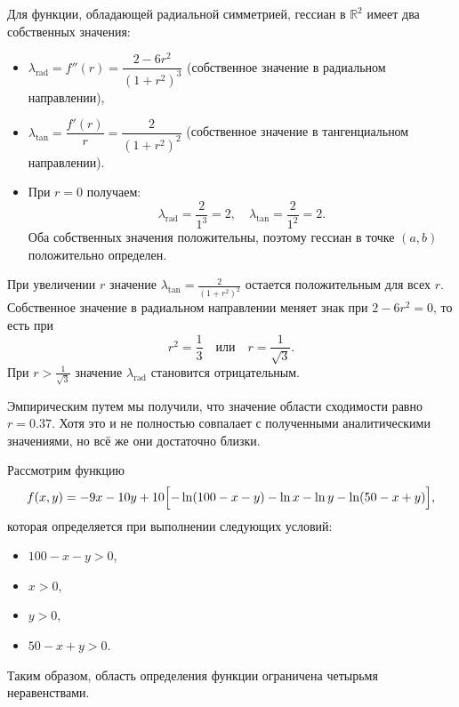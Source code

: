 \documentclass[a4paper,12pt]{article}
\begin{document}
Для функции, обладающей радиальной симметрией, гессиан в \(\mathbb{R}^2\) имеет два собственных значения:
\begin{itemize}
    \item \(\lambda_{\text{rad}} = f''(r) = \dfrac{2-6r^2}{(1+r^2)^3}\) \quad (собственное значение в радиальном направлении),
    \item \(\lambda_{\text{tan}} = \dfrac{f'(r)}{r} = \dfrac{2}{(1+r^2)^2}\) \quad (собственное значение в тангенциальном направлении).
\end{itemize}

\begin{itemize}
    \item При \(r=0\) получаем:
    \[
    \lambda_{\text{rad}} = \frac{2}{1^3} = 2, \quad \lambda_{\text{tan}} = \frac{2}{1^2} = 2.
    \]
    Оба собственных значения положительны, поэтому гессиан в точке \((a,b)\) положительно определен.
\end{itemize}
При увеличении \(r\) значение \(\lambda_{\text{tan}} = \frac{2}{(1+r^2)^2}\) остается положительным для всех \(r\). \\ [0.5em]
Собственное значение в радиальном направлении меняет знак при \(2-6r^2=0\), то есть при
\[
r^2=\frac{1}{3} \quad \text{или} \quad r = \frac{1}{\sqrt{3}}.
\]
При \(r > \frac{1}{\sqrt{3}}\) значение \(\lambda_{\text{rad}}\) становится отрицательным.

Эмпирическим путем мы получили, что значение области сходимости равно $r=0.37$. Хотя это и не полностью совпалает с полученными аналитическими значениями, но всё же они достаточно близки.

Рассмотрим функцию
\[
f(x,y) = -9x - 10y + 10\Bigl[-\ln(100-x-y) - \ln x - \ln y - \ln(50-x+y)\Bigr],
\]
которая определяется при выполнении следующих условий:
\begin{itemize}
    \item \(100-x-y>0\),
    \item \(x>0\),
    \item \(y>0\),
    \item \(50-x+y>0\).
\end{itemize}
Таким образом, область определения функции ограничена четырьмя неравенствами.
\end{document}
